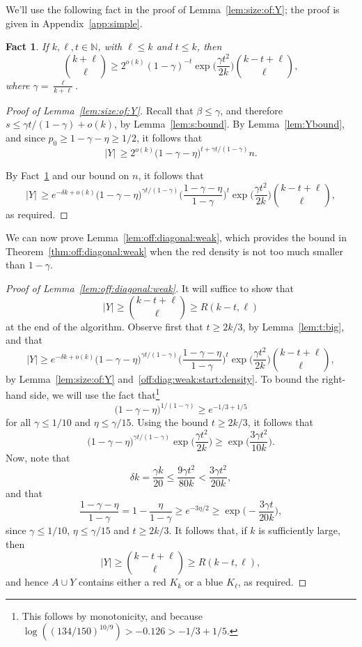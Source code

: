 \documentclass[12pt,reqno]{amsart}
\newtheorem{fact}[theorem]{Fact}
\theoremstyle{definition}
\theoremstyle{remark}
\newcommand\N{\mathbb{N}}
\renewcommand{\le}{\leqslant}
\renewcommand{\ge}{\geqslant}
\def\N{\mathbb{N}}
\begin{document}
We'll use the following fact in the proof of Lemma~\ref{lem:size:of:Y}; the proof is given in Appendix~\ref{app:simple}. 

\begin{fact}\label{binomial:fact4}
If $k,\ell,t \in \N$, with $\ell \le k$ and $t \le k$, then
$${k + \ell \choose \ell} \ge 2^{o(k)} (1-\gamma)^{-t} \exp\bigg( \frac{\gamma t^2}{2k} \bigg) {k - t + \ell \choose \ell},$$
where $\gamma = \frac{\ell}{k+\ell}$.  
\end{fact}

\begin{proof}[Proof of Lemma~\ref{lem:size:of:Y}]
Recall that $\beta \le \gamma$, and therefore $s \le \gamma t / (1 - \gamma) + o(k)$, by Lemma~\ref{lem:s:bound}. By Lemma~\ref{lem:Ybound}, and since $p_0 \ge 1 - \gamma - \eta \ge 1/2$, it follows that 
$$|Y| \, \ge 2^{o(k)} \big( 1 - \gamma - \eta \big)^{t + \gamma t / (1 - \gamma)} n.$$

\pagebreak

\noindent By Fact~\ref{binomial:fact4} and our bound on $n$, it follows that
$$|Y| \, \ge e^{-\delta k + o(k)} \big( 1 - \gamma - \eta \big)^{\gamma t / (1 - \gamma)} \bigg( \frac{1 - \gamma - \eta}{1 - \gamma} \bigg)^t \exp\bigg( \frac{\gamma t^2}{2k} \bigg) {k-t+\ell \choose \ell},$$
as required.
\end{proof}

We can now prove Lemma~\ref{lem:off:diagonal:weak}, which provides the bound in Theorem~\ref{thm:off:diagonal:weak} when the red density is not too much smaller than $1 - \gamma$. 

\begin{proof}[Proof of Lemma~\ref{lem:off:diagonal:weak}]
It will suffice to show that
$$|Y| \ge {k-t+\ell \choose \ell} \ge R(k-t,\ell)$$
at the end of the algorithm. Observe first that $t \ge 2k / 3$, by Lemma~\ref{lem:t:big}, and that %
$$|Y| \ge e^{-\delta k + o(k)} \big( 1 - \gamma - \eta \big)^{\gamma t / (1 - \gamma)} \bigg( \frac{1 - \gamma - \eta}{1 - \gamma} \bigg)^t \exp\bigg( \frac{\gamma t^2}{2k} \bigg) {k-t+\ell \choose \ell},$$
by Lemma~\ref{lem:size:of:Y} and~\eqref{off:diag:weak:start:density}. To bound the right-hand side, we will use the fact that\footnote{This follows by monotonicity, and because $\log( (134/150)^{10/9}) > -0.126 > -1/3 + 1/5$.}
$$\big( 1 - \gamma - \eta \big)^{1 / (1 - \gamma)} \ge e^{-1/3 + 1/5}$$
for all $\gamma \le 1/10$ and $\eta \le \gamma/15$. Using the bound $t \ge 2k / 3$, it follows that
$$\big( 1 - \gamma - \eta \big)^{\gamma t / (1 - \gamma)} \exp\bigg( \frac{\gamma t^2}{2k} \bigg) \ge \exp\bigg( \frac{3\gamma t^2}{10k} \bigg).$$
Now, note that
$$\delta k = \frac{\gamma k}{20} \le \frac{9\gamma t^2}{80k} < \frac{3\gamma t^2}{20k},$$
and that 
$$\frac{1 - \gamma - \eta}{1 - \gamma} = 1 - \frac{\eta}{1-\gamma} \ge e^{-3\eta/2} \ge \exp\bigg( - \frac{3\gamma t}{20k} \bigg),$$
since $\gamma \le 1/10$, $\eta \le \gamma/15$ and $t \ge 2k / 3$. It follows that, if $k$ is sufficiently large, then
$$|Y| \ge {k-t+\ell \choose \ell} \ge R(k-t,\ell),$$
and hence $A \cup Y$ contains either a red $K_k$ or a blue $K_\ell$, as required.
\end{proof}
\end{document}
